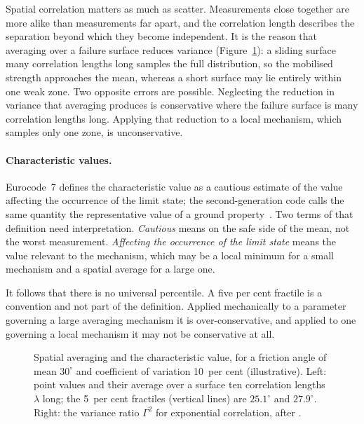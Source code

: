 Spatial correlation matters as much as scatter. Measurements close together
are more alike than measurements far apart, and the correlation length
describes the separation beyond which they become independent. It is the
reason that averaging over a failure surface reduces variance
(Figure~\ref{fig:characteristic-averaging}): a sliding
surface many correlation lengths long samples the full distribution, so the
mobilised strength approaches the mean, whereas a short surface may lie
entirely within one weak zone. Two opposite errors are possible. Neglecting
the reduction in variance that averaging produces is conservative where the
failure surface is many correlation lengths long. Applying that reduction to
a local mechanism, which samples only one zone, is unconservative.

\paragraph{Characteristic values.}
Eurocode~7 defines the characteristic value as a cautious estimate of the
value affecting the occurrence of the limit state; the second-generation code
calls the same quantity the representative value of a ground
property~\citep{en1997part1}. Two terms of that
definition need interpretation. \emph{Cautious} means on the safe side of the mean,
not the worst measurement. \emph{Affecting the occurrence of the limit state}
means the value relevant to the mechanism, which may be a local minimum for
a small mechanism and a spatial average for a large one.

It follows that there is no universal percentile. A five per cent fractile is
a convention and not part of the definition. Applied mechanically to a parameter
governing a large averaging mechanism it is over-conservative, and applied
to one governing a local mechanism it may not be conservative at all.

\begin{figure}[htbp]
\centering
{}
\caption{Spatial averaging and the characteristic value, for a friction angle of mean $30^\circ$ and coefficient of variation 10~per cent (illustrative). Left: point values and their average over a surface ten correlation lengths $\lambda$ long; the 5~per cent fractiles (vertical lines) are $25.1^\circ$ and $27.9^\circ$. Right: the variance ratio $\Gamma^2$ for exponential correlation, after \citet{baecher2003reliability}.}
\label{fig:characteristic-averaging}
\end{figure}

